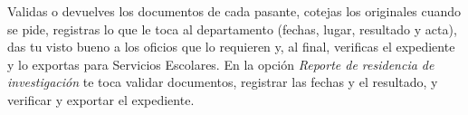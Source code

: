 \documentclass[11pt,a4paper]{article}
\begin{document}
{\small\tableofcontents}
\newpage
\begin{quevasahacer}
Validas o devuelves los documentos de cada pasante, cotejas los originales cuando se pide, registras lo que le toca al departamento (fechas, lugar, resultado y acta), das tu visto bueno a los oficios que lo requieren y, al final, verificas el expediente y lo exportas para Servicios Escolares. En la opción \emph{Reporte de residencia de investigación} te toca validar documentos, registrar las fechas y el resultado, y verificar y exportar el expediente.
\end{quevasahacer}



\end{document}
